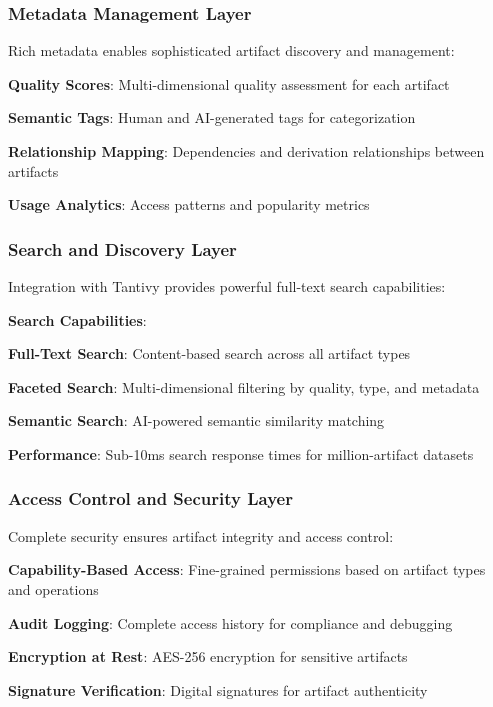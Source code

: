 \subsubsection*{Metadata Management Layer}

Rich metadata enables sophisticated artifact discovery and management:

\begin{compactlist}
    \item \textbf{Quality Scores}: Multi-dimensional quality assessment for each artifact
    \item \textbf{Semantic Tags}: Human and AI-generated tags for categorization
    \item \textbf{Relationship Mapping}: Dependencies and derivation relationships between artifacts
    \item \textbf{Usage Analytics}: Access patterns and popularity metrics
\end{compactlist}

\subsubsection*{Search and Discovery Layer}

Integration with Tantivy provides powerful full-text search capabilities:

\begin{alertbox}
\textbf{Search Capabilities}:
\begin{compactlist}
    \item \textbf{Full-Text Search}: Content-based search across all artifact types
    \item \textbf{Faceted Search}: Multi-dimensional filtering by quality, type, and metadata
    \item \textbf{Semantic Search}: AI-powered semantic similarity matching
    \item \textbf{Performance}: Sub-10ms search response times for million-artifact datasets
\end{compactlist}
\end{alertbox}

\subsubsection*{Access Control and Security Layer}

Complete security ensures artifact integrity and access control:

\begin{expandedlist}
    \item \textbf{Capability-Based Access}: Fine-grained permissions based on artifact types and operations
    \item \textbf{Audit Logging}: Complete access history for compliance and debugging
    \item \textbf{Encryption at Rest}: AES-256 encryption for sensitive artifacts
    \item \textbf{Signature Verification}: Digital signatures for artifact authenticity
\end{expandedlist}

